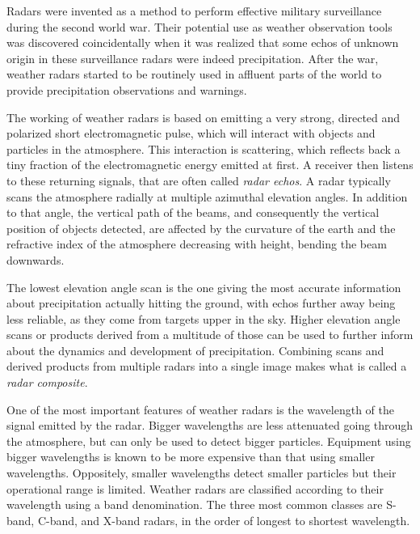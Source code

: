 Radars were invented as a method to perform effective military surveillance during the second world war. Their potential use as weather observation tools was discovered coincidentally when it was realized that some echos of unknown origin in these surveillance radars were indeed precipitation. After the war, weather radars started to be routinely used in affluent parts of the world to provide precipitation observations and warnings.\cite{fabry_radar_2018}


The working of weather radars is based on emitting a very strong, directed and polarized short  electromagnetic pulse, which will interact with objects and particles in the atmosphere. This interaction is scattering, which reflects back a tiny fraction of the electromagnetic energy emitted at first. A receiver then listens to these returning signals, that are often called \textit{radar echos}. A radar typically scans the atmosphere radially at multiple azimuthal elevation angles. In addition to that angle, the vertical path of the beams, and consequently the vertical position of objects detected, are affected by the curvature of the earth and the refractive index of the atmosphere decreasing with height, bending the beam downwards. \cite{fabry_radar_2018}

The lowest elevation angle scan is the one giving the most accurate information about precipitation actually hitting the ground, with echos further away being less reliable, as they come from targets upper in the sky. Higher elevation angle scans or products derived from a multitude of those can be used to further inform about the dynamics and development of precipitation. Combining scans and derived products from multiple radars into a single image makes what is called a \textit{radar composite}.

One of the most important features of weather radars is the wavelength of the signal emitted by the radar. Bigger wavelengths are less attenuated going through the atmosphere, but can only be used to detect bigger particles. Equipment using bigger wavelengths is known to be more expensive than that using smaller wavelengths. Oppositely, smaller wavelengths detect smaller particles but their operational range is limited. Weather radars are classified according to their wavelength using a band denomination. The three most common classes are S-band, C-band, and X-band radars, in the order of longest to shortest wavelength.

